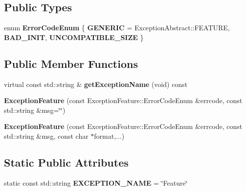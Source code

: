 \subsection*{Public Types}
\begin{DoxyCompactItemize}
\item 
enum {\bfseries Error\+Code\+Enum} \{ {\bfseries G\+E\+N\+E\+R\+IC} = Exception\+Abstract\+:\+:F\+E\+A\+T\+U\+RE, 
{\bfseries B\+A\+D\+\_\+\+I\+N\+IT}, 
{\bfseries U\+N\+C\+O\+M\+P\+A\+T\+I\+B\+L\+E\+\_\+\+S\+I\+ZE}
 \}\hypertarget{classdynamic__graph_1_1ExceptionFeature_a0699b7c4631350c8c1c0eb39a11426f1}{}\label{classdynamic__graph_1_1ExceptionFeature_a0699b7c4631350c8c1c0eb39a11426f1}

\end{DoxyCompactItemize}
\subsection*{Public Member Functions}
\begin{DoxyCompactItemize}
\item 
virtual const std\+::string \& {\bfseries get\+Exception\+Name} (void) const \hypertarget{classdynamic__graph_1_1ExceptionFeature_aec48d79033199babc16d37048f61aba4}{}\label{classdynamic__graph_1_1ExceptionFeature_aec48d79033199babc16d37048f61aba4}

\item 
{\bfseries Exception\+Feature} (const Exception\+Feature\+::\+Error\+Code\+Enum \&errcode, const std\+::string \&msg=\char`\"{}\char`\"{})\hypertarget{classdynamic__graph_1_1ExceptionFeature_a76a3b0adc5f5881b8b3609ddf989f24a}{}\label{classdynamic__graph_1_1ExceptionFeature_a76a3b0adc5f5881b8b3609ddf989f24a}

\item 
{\bfseries Exception\+Feature} (const Exception\+Feature\+::\+Error\+Code\+Enum \&errcode, const std\+::string \&msg, const char $\ast$format,...)\hypertarget{classdynamic__graph_1_1ExceptionFeature_a88a704700091fa451ee9bc6db1ad793e}{}\label{classdynamic__graph_1_1ExceptionFeature_a88a704700091fa451ee9bc6db1ad793e}

\end{DoxyCompactItemize}
\subsection*{Static Public Attributes}
\begin{DoxyCompactItemize}
\item 
static const std\+::string {\bfseries E\+X\+C\+E\+P\+T\+I\+O\+N\+\_\+\+N\+A\+ME} = \char`\"{}Feature\char`\"{}\hypertarget{classdynamic__graph_1_1ExceptionFeature_a977865e1bf4940aed64bf434ec72bf18}{}\label{classdynamic__graph_1_1ExceptionFeature_a977865e1bf4940aed64bf434ec72bf18}

\end{DoxyCompactItemize}
